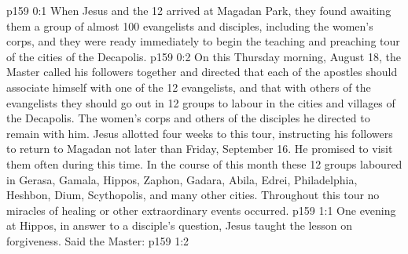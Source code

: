 \author{Midwayer Commission}
\vs p159 0:1 When Jesus and the 12 arrived at Magadan Park, they found awaiting them a group of almost 100 evangelists and disciples, including the women’s corps, and they were ready immediately to begin the teaching and preaching tour of the cities of the Decapolis.
\vs p159 0:2 On this Thursday morning, August 18, the Master called his followers together and directed that each of the apostles should associate himself with one of the 12 evangelists, and that with others of the evangelists they should go out in 12 groups to labour in the cities and villages of the Decapolis. The women’s corps and others of the disciples he directed to remain with him. Jesus allotted four weeks to this tour, instructing his followers to return to Magadan not later than Friday, September 16. He promised to visit them often during this time. In the course of this month these 12 groups laboured in Gerasa, Gamala, Hippos, Zaphon, Gadara, Abila, Edrei, Philadelphia, Heshbon, Dium, Scythopolis, and many other cities. Throughout this tour no miracles of healing or other extraordinary events occurred.
\vs p159 1:1 One evening at Hippos, in answer to a disciple’s question, Jesus taught the lesson on forgiveness. Said the Master:
\vs p159 1:2 \pc {}
